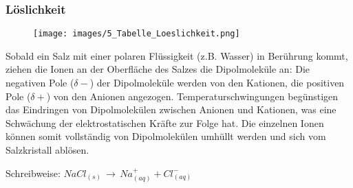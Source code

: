 \subsubsection{Löslichkeit}
\begin{figure}[h!]
	\centering
	\texttt{[image: images/5\_Tabelle\_Loeslichkeit.png]}
\end{figure}
Sobald ein Salz mit einer polaren Flüssigkeit (z.B. Wasser) in Berührung kommt, ziehen die Ionen an der Oberfläche des Salzes die Dipolmoleküle an: Die negativen Pole ($\delta-$) der Dipolmoleküle werden von den Kationen, die positiven Pole ($\delta+$) von den Anionen angezogen. Temperaturschwingungen begünstigen das Eindringen von Dipolmolekülen zwischen Anionen und Kationen, was eine Schwächung der elektrostatischen Kräfte zur Folge hat. Die einzelnen Ionen können somit vollständig von Dipolmolekülen umhüllt werden und sich vom Salzkristall ablösen.

Schreibweise: $NaCl_{(s)} \, \rightarrow \, Na^+_{(aq)} + Cl^-_{(aq)}$